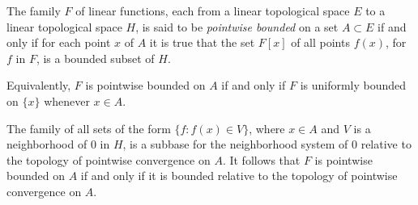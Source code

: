 The family $F$ of linear functions, each from a linear topological space $E$ to a linear topological space $H$, is said to be \emph{pointwise bounded} on a set $A \subset E$ if and only if for each point $x$ of $A$ it is true that the set $F[x]$ of all points $f(x)$, for $f$ in $F$, is a bounded subset of $H$.

Equivalently, $F$ is pointwise bounded on $A$ if and only if $F$ is uniformly bounded on $\{x\}$ whenever $x \in A$.

The family of all sets of the form $\{f: f(x) \in V\}$, where $x \in A$ and $V$ is a neighborhood of $0$ in $H$, is a subbase for the neighborhood system of $0$ relative to the topology of pointwise convergence on $A$. It follows that $F$ is pointwise bounded on $A$ if and only if it is bounded relative to the topology of pointwise convergence on $A$.

